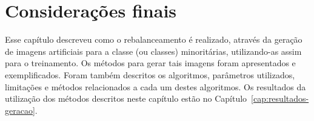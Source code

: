 %
%


\section{Considerações finais}

Esse capítulo descreveu como o rebalanceamento é realizado, através da geração de imagens artificiais para a classe (ou classes) minoritárias, utilizando-as assim para o treinamento. Os métodos para gerar tais imagens foram apresentados e exemplificados. Foram também descritos os algoritmos, parâmetros utilizados, limitações e métodos relacionados a cada um destes algoritmos. Os resultados da utilização dos métodos descritos neste capítulo estão no Capítulo~\ref{cap:resultados-geracao}.

